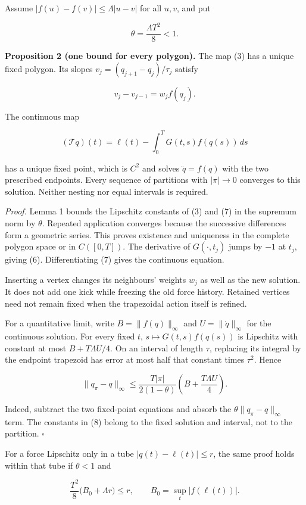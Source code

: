 \documentclass[11pt,a4paper]{article}
\begin{document}
Assume \(|f(u)-f(v)|\le\Lambda|u-v|\) for all \(u,v\), and put

\[\theta=\frac{\Lambda T^2}{8}<1.\tag{5}\]

\textbf{Proposition 2 (one bound for every polygon).} The map (3) has a
unique fixed polygon. Its slopes \(v_j=(q_{j+1}-q_j)/\tau_j\) satisfy

\[v_j-v_{j-1}=w_jf(q_j).\tag{6}\]

The continuous map

\[
 (\mathcal Tq)(t)=\ell(t)-\int_0^T G(t,s)f(q(s))\,ds
 \tag{7}
\]

has a unique fixed point, which is \(C^2\) and solves \(\ddot q=f(q)\)
with the two prescribed endpoints. Every sequence of partitions with
\(|\pi|\to0\) converges to this solution. Neither nesting nor equal
intervals is required.

\emph{Proof.} Lemma 1 bounds the Lipschitz constants of (3) and (7) in
the supremum norm by \(\theta\). Repeated application converges because
the successive differences form a geometric series. This proves
existence and uniqueness in the complete polygon space or in
\(C([0,T])\). The derivative of \(G(\cdot,t_j)\) jumps by \(-1\) at
\(t_j\), giving (6). Differentiating (7) gives the continuous equation.

Inserting a vertex changes its neighbours' weights \(w_j\) as well as
the new solution. It does not add one kick while freezing the old force
history. Retained vertices need not remain fixed when the trapezoidal
action itself is refined.

For a quantitative limit, write \(B=\|f(q)\|_\infty\) and
\(U=\|\dot q\|_\infty\) for the continuous solution. For every fixed
\(t\), \(s\mapsto G(t,s)f(q(s))\) is Lipschitz with constant at most
\(B+T\Lambda U/4\). On an interval of length \(\tau\), replacing its
integral by the endpoint trapezoid has error at most half that constant
times \(\tau^2\). Hence

\[
 \|q_\pi-q\|_\infty\le
 \frac{T|\pi|}{2(1-\theta)}
       \left(B+\frac{T\Lambda U}{4}\right).
 \tag{8}
\]

Indeed, subtract the two fixed-point equations and absorb the
\(\theta\|q_\pi-q\|_\infty\) term. The constants in (8) belong to the
fixed solution and interval, not to the partition. \(\square\)

For a force Lipschitz only in a tube \(|q(t)-\ell(t)|\le r\), the same
proof holds within that tube if \(\theta<1\) and

\[
 \frac{T^2}{8}\big(B_0+\Lambda r\big)\le r,
 \qquad B_0=\sup_t|f(\ell(t))|.
 \tag{9}
\]
\end{document}
